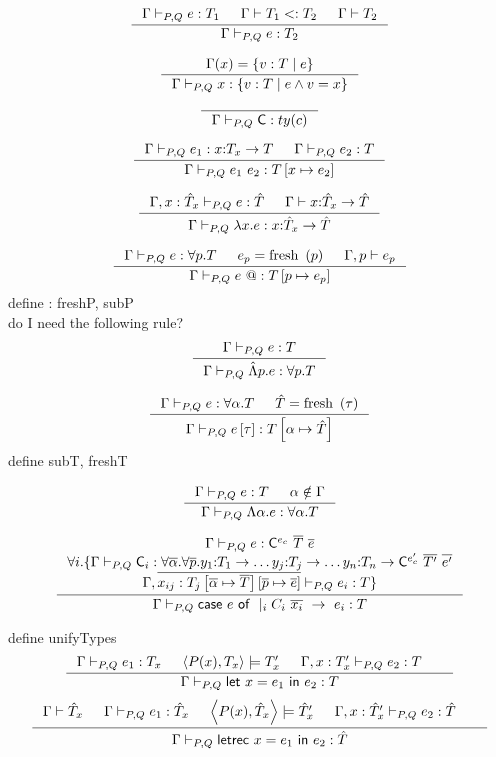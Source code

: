 \documentclass[10pt,a4paper]{article}
\newcommand\highlight[2]{{\setlength\fboxsep{1pt}\colorbox{#1}{#2}}}
\def\NV{\highlight{colorNV}}
\begin{document}
$$
\inference{
	\hasType{\Gamma}{P,Q}{e}{\dTy_1} &
	\isSubType{\Gamma}{\dTy_1}{\dTy_2} &
	\isWellFormed{\Gamma}{\dTy_2}
}{
	\hasType{\Gamma}{P,Q}{e}{\dTy_2}
}[]
$$

$$
\inference{
	\Gamma(x) = \refa{v}{\dTy}{e}
}{
	\hasType{\Gamma}{P,Q}{x}{\refa{v}{\dTy}{e \land v = x}}
}[]
$$

$$
\inference{
}{
	\hasType{\Gamma}{P,Q}{\nhaskell{C}}{ty(c)}
}[]
$$

$$
\inference{
	\hasType{\Gamma}{P,Q}{e_1}{\tfun{x}{\dTy_x}{\dTy}} &
	\hasType{\Gamma}{P,Q}{e_2}{\dTy}
}{
	\hasType{\Gamma}{P,Q}{\eapp{e_1}{e_2}}{\dTy \sub{x}{e_2}}
}[]
$$

$$
\inference{
	\hasType{\Gamma, x:\lTy_x}{P,Q}{e}{\lTy} &
	\isWellFormed{\Gamma}{\tfun{x}{\lTy_x}{\lTy}}
}{
	\hasType{\Gamma}{P,Q}{\elam{x}{e}}{\tfun{x}{\lTy_x}{\lTy}}
}[]
$$


$$
\inference{
	\hasType{\Gamma}{P,Q}{e}{\tforallPr{p}{\dTy}} &
	e_p = \freshP{p} &
	\isWellFormedP{\Gamma}{p}{e_p}
}{
	\hasType{\Gamma}{P,Q}{\epapp{e}}{\dTy \subP{p}{e_p}}
}[]
$$
\NV{define : freshP, subP}\\
\NV{do I need the following rule?}
$$
\inference{
	\hasType{\Gamma}{P,Q}{e}{\dTy} 
}{
	\hasType{\Gamma}{P,Q}{\eplam{p}{e}}{\tforallPr{p}{\dTy}}
}[]
$$

$$
\inference{
	\hasType{\Gamma}{P,Q}{e}{\tforallTy{\alpha}{\dTy}} &
	\lTy = \freshT{\tau}
}{
	\hasType{\Gamma}{P,Q}{\etapp{e}{\tau}}{\dTy \subT{\alpha}{\lTy}}
}[]
$$
\NV{define subT, freshT}

$$
\inference{
	\hasType{\Gamma}{P,Q}{e}{\dTy} &
	\alpha \notin \Gamma 
}{
	\hasType{\Gamma}{P,Q}{\etlam{\alpha}{e}}{\tforallTy{\alpha}{\dTy}}
}[]
$$

$$
\inference{
	\hasType{\Gamma}{P,Q}{e}
		{\tcon{\nhaskell{C}}{e_c}{\listOf{\dTy}}{\listOf{e}}} \\
	\forall i . \{
		\hasType{\Gamma}{P,Q}{\nhaskell{C}_i}
			{\tforallTy{\listOf{\alpha}}{\tforallPr{\listOf{p}}{
				\tfun{y_1}{\dTy_1}{
				\tfun{\dots y_j}{\dTy_j}{
				\tfun{\dots y_n}{\dTy_n}{
				\tcon{\nhaskell{C}}{e'_c}{\listOf{\dTy'}}{\listOf{e'}}}}}			
			}}} \\			
		\hasType{\Gamma, \listOf{x_{ij} : {\dTy_j \subT{\listOf{\alpha}}{\listOf{\dTy}}\subP{\listOf{p}}{\listOf{e}} }}}{P,Q}{e_i}{\dTy}	
	\}
}{
	\hasType{\Gamma}{P,Q}{\ecase{e}{C_i \ \listOf{x_i}}{e_i}}{\dTy}
}[]
$$

\NV{define unifyTypes}
$$
\inference{
	\hasType{\Gamma}{P,Q}{e_1}{\dTy_x} &
	\unifyTypes{P(x)}{\dTy_x}{\dTy_x'} &
	\hasType{\Gamma,x:\dTy_x'}{P,Q}{e_2}{\dTy} &
}{
	\hasType{\Gamma}{P,Q}{\elet{x}{e_1}{e_2}}{\dTy}
}[]
$$
$$
\inference{
	\isWellFormed{\Gamma}{\lTy_x} &
	\hasType{\Gamma}{P,Q}{e_1}{\lTy_x} &
	\unifyTypes{P(x)}{\lTy_x}{\lTy_x'} &
	\hasType{\Gamma,x:\lTy_x'}{P,Q}{e_2}{\lTy} &
}{
	\hasType{\Gamma}{P,Q}{\eletrec{x}{e_1}{e_2}}{\lTy}
}[]
$$
\end{document}
